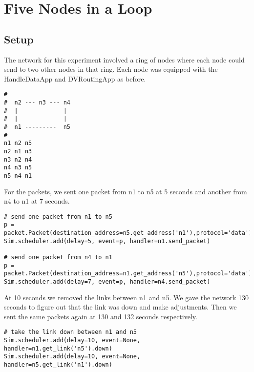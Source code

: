 \documentclass[11pt]{article}
\begin{document}
\section{Five Nodes in a Loop}

\subsection{Setup}

The network for this experiment involved a ring of nodes where each node could send to two other nodes in that ring. Each node was equipped with the HandleDataApp and DVRoutingApp as before.

\vspace{5mm}

\begin{lstlisting}
#
#  n2 --- n3 --- n4
#  |             |
#  |             |
#  n1 ---------  n5
# 
n1 n2 n5
n2 n1 n3
n3 n2 n4
n4 n3 n5
n5 n4 n1
\end{lstlisting}

\vspace{5mm}

For the packets, we sent one packet from n1 to n5 at 5 seconds and another from n4 to n1 at 7 seconds. 

\vspace{5mm}

\begin{lstlisting}
# send one packet from n1 to n5
p = packet.Packet(destination_address=n5.get_address('n1'),protocol='data')
Sim.scheduler.add(delay=5, event=p, handler=n1.send_packet)

# send one packet from n4 to n1
p = packet.Packet(destination_address=n1.get_address('n5'),protocol='data')
Sim.scheduler.add(delay=7, event=p, handler=n4.send_packet)
\end{lstlisting}

\vspace{5mm}

At 10 seconds we removed the links between n1 and n5. We gave the network 130 seconds to figure out that the link was down and make adjustments. Then we sent the same packets again at 130 and 132 seconds respectively.

\vspace{5mm}

\begin{lstlisting}
# take the link down between n1 and n5
Sim.scheduler.add(delay=10, event=None, handler=n1.get_link('n5').down)
Sim.scheduler.add(delay=10, event=None, handler=n5.get_link('n1').down)
\end{lstlisting}
\end{document}
